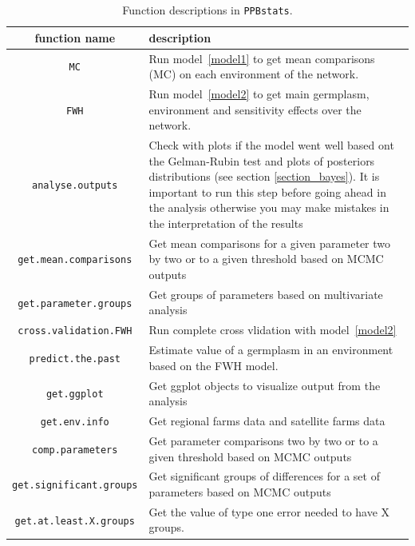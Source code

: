 \documentclass{article}\usepackage[]{graphicx}\usepackage[]{color}
\newcommand{\pack}{\texttt{PPBstats}}
\begin{document}
\begin{table}[t]
\begin{tabular}{cp{}}

\hline
\textbf{function name} & \textbf{description} \\

\hline
\hline

\texttt{MC} & Run model~\ref{model1} to get mean comparisons (MC) on each environment of the network.\\
\hline

\texttt{FWH} & Run model~\ref{model2} to get main germplasm, environment and sensitivity effects over the network. \\
\hline

\texttt{analyse.outputs} & Check with plots if the model went well based ont the Gelman-Rubin test and plots of posteriors distributions (see section \ref{section_bayes}). It is important to run this step before going ahead in the analysis otherwise you may make mistakes in the interpretation of the results \\
\hline

\texttt{get.mean.comparisons} & Get mean comparisons for a given parameter two by two or to a given threshold based on MCMC outputs \\
\hline

\texttt{get.parameter.groups} & Get groups of parameters based on multivariate analysis \\
\hline

\texttt{cross.validation.FWH} & Run complete cross vlidation with model~\ref{model2} \\
\hline

\texttt{predict.the.past} & Estimate value of a germplasm in an environment based on the FWH model. \\
\hline

\texttt{get.ggplot} & Get ggplot objects to visualize output from the analysis \\
\hline

\hline

\texttt{get.env.info} & Get regional farms data and satellite farms data \\
\hline

\texttt{comp.parameters} & Get parameter comparisons two by two or to a given threshold based on MCMC outputs \\
\hline

\texttt{get.significant.groups} & Get significant groups of differences for a set of parameters based on MCMC outputs \\
\hline

\texttt{get.at.least.X.groups} & Get the value of type one error needed to have X groups. \\
\hline


\end{tabular}
\caption{Function descriptions in \pack.}
\label{function_descriptions}
\end{table}
\end{document}
